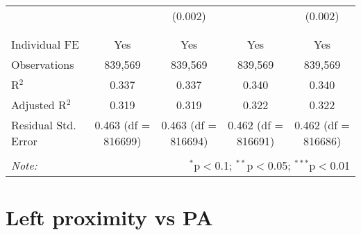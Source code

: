 \documentclass[
]{article}
\begin{document}
\begin{table}[!htbp]
{\begin{tabular}{@{\extracolsep{5pt}}lcccc}
  &  & (0.002) &  & (0.002) \\ 
  & & & & \\ 
\hline \\[-1.8ex] 
Individual FE & Yes & Yes & Yes & Yes \\ 
Observations & 839,569 & 839,569 & 839,569 & 839,569 \\ 
R$^{2}$ & 0.337 & 0.337 & 0.340 & 0.340 \\ 
Adjusted R$^{2}$ & 0.319 & 0.319 & 0.322 & 0.322 \\ 
Residual Std. Error & 0.463 (df = 816699) & 0.463 (df = 816694) & 0.462 (df = 816691) & 0.462 (df = 816686) \\ 
\hline 
\hline \\[-1.8ex] 
\textit{Note:}  & \multicolumn{4}{r}{$^{*}$p$<$0.1; $^{**}$p$<$0.05; $^{***}$p$<$0.01} \\ 
\end{tabular}
} 
\end{table} 
\newpage
\section{Left proximity vs PA}
\end{document}
